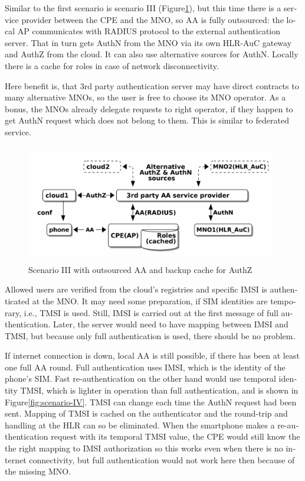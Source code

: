 \documentclass[12pt,a4paper,english]{tutthesis}
\begin{document}
\begin{otherlanguage}{english}
\label{scenario-iii}

Similar to the first scenario is scenario III (Figure\ref{fig:scenario-III}), 
but this time there is a service provider between the CPE and the MNO, so AA is fully outsourced:
the local AP communicates with RADIUS protocol to the external
authentication server. That in turn gets AuthN from the MNO via its own
HLR-AuC gateway and AuthZ from the cloud. It can also use alternative
sources for AuthN.
Locally there is a cache for roles in case of network disconnectivity.

Here benefit is, that 3rd party authentication server may have direct
contracts to many alternative MNOs, so the user is free to choose its
MNO operator. As a bonus,  the MNOs already delegate requests to right
operator, if they happen to get AuthN request which does not belong to
them. This is similar to federated service.

\begin{figure}[htb]
\centering
\includegraphics[width=.9\linewidth]{scenIII.png}
\caption{\label{fig:scenario-III}Scenario III with outsourced AA and backup cache for AuthZ}
\end{figure}

Allowed users are verified from the cloud's registries and specific IMSI is
authenticated at the MNO.  It may need some preparation, if SIM
identities are temporary, i.e., TMSI is used.  Still, IMSI is carried
out at the first message 
of full authentication. Later, the server would need to have mapping
between IMSI and TMSI, but because only full authentication is used,
there should be no problem.



If internet connection is down, local AA is still possible, if there
has been at least one full AA round.
Full authentication uses IMSI, which is the identity of the phone's
SIM.  Fast re-authentication on the other hand would 
use temporal identity TMSI, which is lighter in operation than full
authentication, and is shown in Figure\ref{fig:scenario-IV}. TMSI can
change each time the AuthN request had been sent. Mapping of TMSI is
cached on the authenticator and the round-trip and handling at the HLR can
so be eliminated.  When the smartphone makes a re-authentication
request with its temporal TMSI value, the CPE would still know the
the right mapping to IMSI authorization so this works
even when there is no internet connectivity, but full authentication
would not work here then because of the missing MNO.



\end{otherlanguage}
\end{document}
